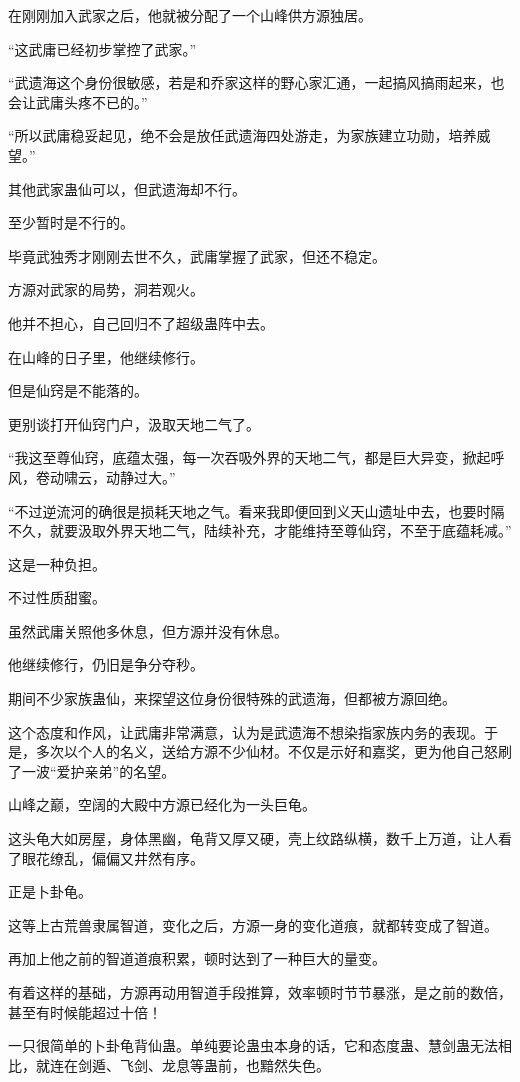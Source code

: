 \begin{this_body}
在刚刚加入武家之后，他就被分配了一个山峰供方源独居。

“这武庸已经初步掌控了武家。”

“武遗海这个身份很敏感，若是和乔家这样的野心家汇通，一起搞风搞雨起来，也会让武庸头疼不已的。”

“所以武庸稳妥起见，绝不会是放任武遗海四处游走，为家族建立功勋，培养威望。”

其他武家蛊仙可以，但武遗海却不行。

至少暂时是不行的。

毕竟武独秀才刚刚去世不久，武庸掌握了武家，但还不稳定。

方源对武家的局势，洞若观火。

他并不担心，自己回归不了超级蛊阵中去。

在山峰的日子里，他继续修行。

但是仙窍是不能落的。

更别谈打开仙窍门户，汲取天地二气了。

“我这至尊仙窍，底蕴太强，每一次吞吸外界的天地二气，都是巨大异变，掀起呼风，卷动啸云，动静过大。”

“不过逆流河的确很是损耗天地之气。看来我即便回到义天山遗址中去，也要时隔不久，就要汲取外界天地二气，陆续补充，才能维持至尊仙窍，不至于底蕴耗减。”

这是一种负担。

不过性质甜蜜。

虽然武庸关照他多休息，但方源并没有休息。

他继续修行，仍旧是争分夺秒。

期间不少家族蛊仙，来探望这位身份很特殊的武遗海，但都被方源回绝。

这个态度和作风，让武庸非常满意，认为是武遗海不想染指家族内务的表现。于是，多次以个人的名义，送给方源不少仙材。不仅是示好和嘉奖，更为他自己怒刷了一波“爱护亲弟”的名望。

山峰之巅，空阔的大殿中方源已经化为一头巨龟。

这头龟大如房屋，身体黑幽，龟背又厚又硬，壳上纹路纵横，数千上万道，让人看了眼花缭乱，偏偏又井然有序。

正是卜卦龟。

这等上古荒兽隶属智道，变化之后，方源一身的变化道痕，就都转变成了智道。

再加上他之前的智道道痕积累，顿时达到了一种巨大的量变。

有着这样的基础，方源再动用智道手段推算，效率顿时节节暴涨，是之前的数倍，甚至有时候能超过十倍！

一只很简单的卜卦龟背仙蛊。单纯要论蛊虫本身的话，它和态度蛊、慧剑蛊无法相比，就连在剑遁、飞剑、龙息等蛊前，也黯然失色。


\end{this_body}
